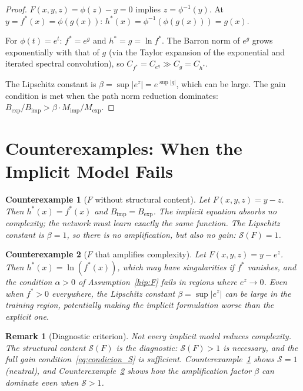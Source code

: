 \documentclass[12pt]{article}
\newtheorem{remark}{Remark}
\newtheorem{counterexample}{Counterexample}
\begin{document}
\begin{proof}
$F(x,y,z) = \phi(z) - y = 0$ implies $z = \phi^{-1}(y)$.
At $y = f^*(x) = \phi(g(x))$:
$h^*(x) = \phi^{-1}(\phi(g(x))) = g(x)$.

For $\phi(t) = e^t$: $f^* = e^g$ and $h^* = g = \ln f^*$.
The Barron norm of $e^g$ grows exponentially with that of $g$
(via the Taylor expansion of the exponential and iterated spectral
convolution), so $C_{f^*} = C_{e^g} \gg C_g = C_{h^*}$.

The Lipschitz constant is
$\beta = \sup |e^z| = e^{\sup |g|}$, which can be large.
The gain condition is met when the path norm reduction dominates:
$B_{\mathrm{exp}} / B_{\mathrm{imp}} > \beta \cdot
M_{\mathrm{imp}} / M_{\mathrm{exp}}$.
\end{proof}

\section{Counterexamples: When the Implicit Model Fails}
\label{sec:counter}

\begin{counterexample}[$F$ without structural content]
\label{ce:trivial}
Let $F(x,y,z) = y - z$.
Then $h^*(x) = f^*(x)$ and $B_{\mathrm{imp}} = B_{\mathrm{exp}}$.
The implicit equation absorbs no complexity; the network must learn
exactly the same function.
The Lipschitz constant is $\beta = 1$, so there is no amplification,
but also no gain: $\mathcal{S}(F) = 1$.
\end{counterexample}

\begin{counterexample}[$F$ that amplifies complexity]
\label{ce:amplification}
Let $F(x,y,z) = y - e^z$.
Then $h^*(x) = \ln(f^*(x))$, which may have singularities if $f^*$
vanishes, and the condition $\alpha > 0$ of Assumption~\ref{hip:F}
fails in regions where $e^z \to 0$.
Even when $f^* > 0$ everywhere, the Lipschitz constant
$\beta = \sup |e^z|$ can be large in the training region, potentially
making the implicit formulation worse than the explicit one.
\end{counterexample}

\begin{remark}[Diagnostic criterion]
\label{rem:diagnostic}
Not every implicit model reduces complexity.
The structural content $\mathcal{S}(F)$ is the diagnostic:
$\mathcal{S}(F) > 1$ is necessary, and the full gain
condition~\eqref{eq:condicion_S} is sufficient.
Counterexample~\ref{ce:trivial} shows $\mathcal{S} = 1$ (neutral),
and Counterexample~\ref{ce:amplification} shows how
the amplification factor $\beta$ can dominate even when $\mathcal{S}
> 1$.
\end{remark}
\end{document}
